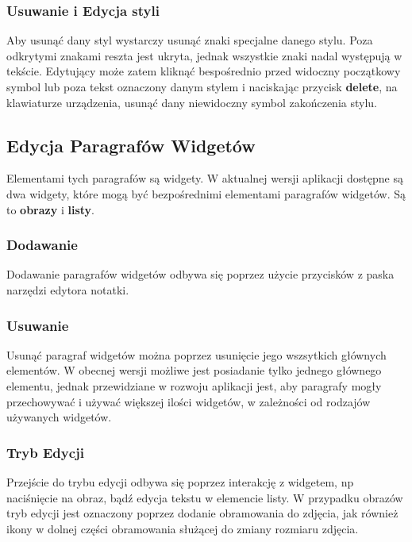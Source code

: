 \subsubsection{Usuwanie i Edycja styli}

Aby usunąć dany styl wystarczy usunąć znaki specjalne danego stylu. Poza odkrytymi znakami reszta jest ukryta, jednak wszystkie znaki nadal występują w tekście. Edytujący może zatem kliknąć bespośrednio przed widoczny początkowy symbol lub poza tekst oznaczony danym stylem i naciskając przycisk \textbf{delete}, na klawiaturze urządzenia, usunąć dany niewidoczny symbol zakończenia stylu.

\pagebreak

\subsection{Edycja Paragrafów Widgetów}

Elementami tych paragrafów są widgety. W aktualnej wersji aplikacji dostępne są dwa widgety, które mogą być bezpośrednimi elementami paragrafów widgetów.
Są to \textbf{obrazy} i \textbf{listy}.

\subsubsection{Dodawanie}
\label{sub:dodawanieWidgetow}

Dodawanie paragrafów widgetów odbywa się poprzez użycie przycisków z paska narzędzi edytora notatki.

\subsubsection{Usuwanie}
\label{sub:usuwanieWidgetow}

Usunąć paragraf widgetów można poprzez usunięcie jego wszsytkich głównych elementów. W obecnej wersji możliwe jest posiadanie tylko jednego głównego elementu, jednak przewidziane w rozwoju aplikacji jest, aby paragrafy mogły przechowywać i używać większej ilości widgetów, w zależności od rodzajów używanych widgetów.

\subsubsection{Tryb Edycji}

Przejście do trybu edycji odbywa się poprzez interakcję z widgetem, np naciśnięcie na obraz, bądź edycja tekstu w elemencie listy.
W przypadku obrazów tryb edycji jest oznaczony poprzez dodanie obramowania do zdjęcia, jak również ikony w dolnej części obramowania służącej do zmiany rozmiaru zdjęcia.

